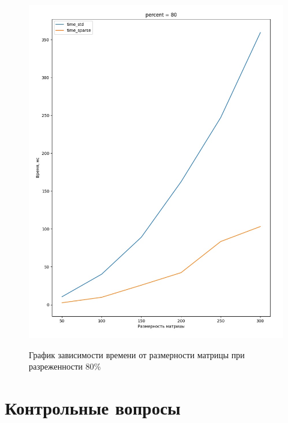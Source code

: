 \begin{figure}
	\centering
	\caption{График зависимости времени от размерности матрицы при разреженности 80\%}
	\includegraphics[width=\linewidth]{img/graph80.jpg}
	\label{graph80}
\end{figure}

\pagebreak

\chapter{Контрольные вопросы}

